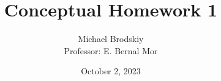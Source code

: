 


\title{Conceptual Homework 1}
\date{October 2, 2023}
\author{Michael Brodskiy\\ \small Professor: E. Bernal Mor}



\maketitle

